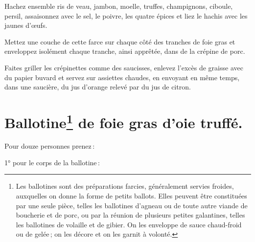 Hachez ensemble ris de veau, jambon, moelle, truffes, champignons, ciboule,
persil, assaisonnez avec le sel, le poivre, les quatre épices et liez le hachis
avec les jaunes d'œufs.

Mettez une couche de cette farce sur chaque côté des tranches de foie gras et
enveloppez isolément chaque tranche, ainsi apprêtée, dans de la crépine de
porc.

Faites griller les crépinettes comme des saucisses, enlevez l'excès de graisse
avec du papier buvard et servez sur assiettes chaudes, en envoyant en même
temps, dans une saucière, du jus d'orange relevé par du jus de citron.

\section*{\centering Ballotine\footnote{
Les ballotines sont des préparations farcies, généralement servies froides,
auxquelles on donne la forme de petits ballots. Elles peuvent être constituées
par une seule pièce, telles les ballotines d'agneau ou de toute autre viande de
boucherie et de porc, ou par la réunion de plusieurs petites galantines, telles
les ballotines de volaille et de gibier. On les enveloppe de sauce chaud-froid
ou de gelée ; on les décore et on les garnit à volonté.} de foie gras d'oie
truffé.}
{}

Pour douze personnes prenez :

\medskip

1° pour le corps de la ballotine :

